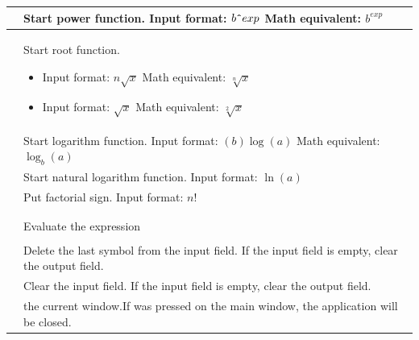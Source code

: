 \documentclass[a5paper, 11pt]{article}
\makeatletter
\def\setmenukeyswin{\def\tw@mk@os{win}}
\makeatother
\begin{document}
\begin{xltabular}{\textwidth}{
        >{\setmenukeyswin}c @{\hspace{3em}} 
        >{\renewcommand\cellalign{cl}}X}
        \keys{\^{}} & Start power function. \newline Input format: $b\texttt{\^{}}exp$ \newline Math equivalent: $b^{exp}$
        \\* \midrule
        
         & Start root function.
        \begin{itemize}[leftmargin=*]
            \item  Input format: $n \sqrt x$ \newline Math equivalent: $\sqrt[n]{x}$
            \item  Input format: $\sqrt x$ \newline Math equivalent: $\sqrt[2]{x}$
        \end{itemize}
        \\* \midrule
        
         & Start logarithm function. \newline Input format: $(b)\log(a)$ \newline Math equivalent: $\log_b(a)$
        \\* \midrule
        
         & Start natural logarithm function. \newline Input format: $\ln(a)$
        \\* \midrule
        
        \keys{!} & Put factorial sign. \newline Input format: $n!$
        \\* \midrule
        
        \\* \midrule
        
         & Evaluate the expression
        \\*
        \midrule
        
         & Delete the last symbol from the input field. \newline If the input field is empty, clear the output field.
        \\*
        \midrule
        
         & Clear the input field. \newline If the input field is empty, clear the output field.
        \\* \midrule
        
        \keys{\esc} & the  current window.\newline If was pressed on the main window, the application will be closed.
        \\*
    \end{xltabular}
    
\pagebreak
\end{document}
